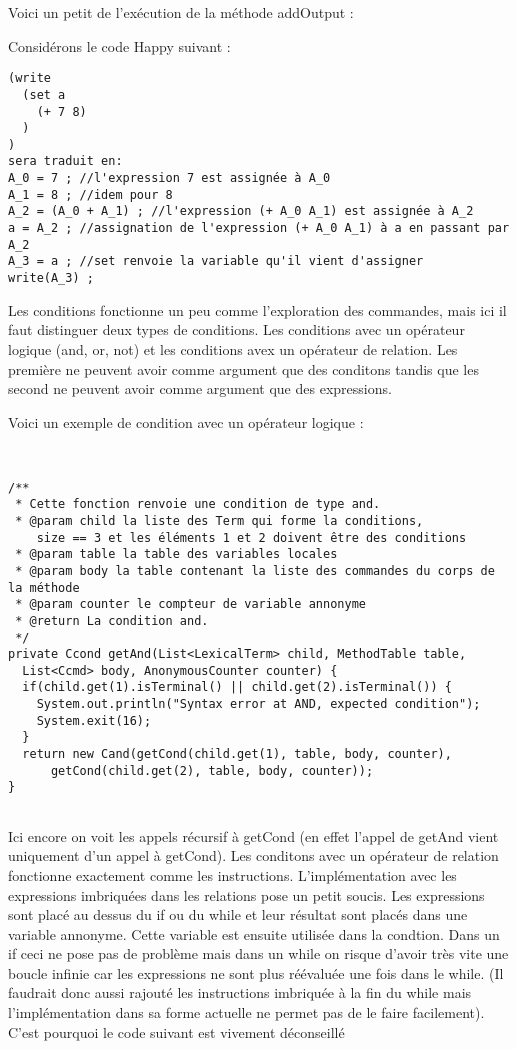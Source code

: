  
Voici un petit de l'exécution de la méthode addOutput :

Considérons le code Happy suivant :
\begin{verbatim}
(write 
  (set a 
    (+ 7 8)
  )
)
sera traduit en:
A_0 = 7 ; //l'expression 7 est assignée à A_0
A_1 = 8 ; //idem pour 8
A_2 = (A_0 + A_1) ; //l'expression (+ A_0 A_1) est assignée à A_2
a = A_2 ; //assignation de l'expression (+ A_0 A_1) à a en passant par A_2
A_3 = a ; //set renvoie la variable qu'il vient d'assigner
write(A_3) ;

\end{verbatim}

Les conditions fonctionne un peu comme l'exploration des commandes, mais ici il faut distinguer deux types de conditions.
Les conditions avec un opérateur logique (and, or, not) et les conditions avex un opérateur de relation. Les première ne peuvent avoir 
comme argument que des conditons tandis que les second ne peuvent avoir comme argument que des expressions. 

Voici un exemple de condition avec un opérateur logique :

\begin{verbatim}


/**
 * Cette fonction renvoie une condition de type and.
 * @param child la liste des Term qui forme la conditions, 
    size == 3 et les éléments 1 et 2 doivent être des conditions
 * @param table la table des variables locales
 * @param body la table contenant la liste des commandes du corps de la méthode
 * @param counter le compteur de variable annonyme
 * @return La condition and.
 */
private Ccond getAnd(List<LexicalTerm> child, MethodTable table, 
  List<Ccmd> body, AnonymousCounter counter) {
  if(child.get(1).isTerminal() || child.get(2).isTerminal()) {
    System.out.println("Syntax error at AND, expected condition");
    System.exit(16);
  }
  return new Cand(getCond(child.get(1), table, body, counter),
      getCond(child.get(2), table, body, counter));
}
 
\end{verbatim}

Ici encore on voit les appels récursif à getCond (en effet l'appel de getAnd vient uniquement d'un appel à getCond). 
Les conditons avec un opérateur de relation fonctionne exactement comme les instructions. 
L'implémentation avec les expressions imbriquées dans les relations pose un petit soucis. Les expressions sont placé au dessus du if
ou du while et leur résultat sont placés dans une variable annonyme. Cette variable est ensuite utilisée dans la condtion.
Dans un if ceci ne pose pas de problème mais dans un while on risque d'avoir très vite une boucle infinie car les expressions ne
sont plus réévaluée une fois dans le while. (Il faudrait donc aussi rajouté les instructions imbriquée à la fin du while mais l'implémentation
dans sa forme actuelle ne permet pas de le faire facilement). C'est pourquoi le code suivant est vivement déconseillé

